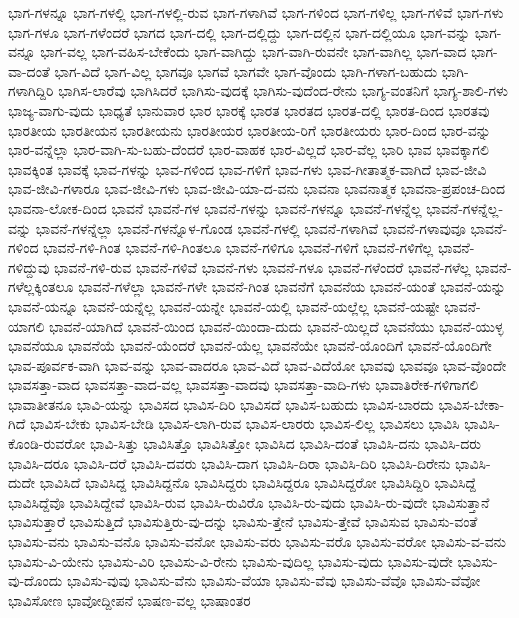 {ಭಾಗ-ಗಳನ್ನೂ
ಭಾಗ-ಗಳಲ್ಲಿ
ಭಾಗ-ಗಳಲ್ಲಿ-ರುವ
ಭಾಗ-ಗಳಾಗಿವೆ
ಭಾಗ-ಗಳಿಂದ
ಭಾಗ-ಗಳಿಲ್ಲ
ಭಾಗ-ಗಳಿವೆ
ಭಾಗ-ಗಳು
ಭಾಗ-ಗಳೂ
ಭಾಗ-ಗಳೆಂದರೆ
ಭಾಗದ
ಭಾಗ-ದಲ್ಲಿ
ಭಾಗ-ದಲ್ಲಿದ್ದು
ಭಾಗ-ದಲ್ಲಿನ
ಭಾಗ-ದಲ್ಲಿಯೂ
ಭಾಗ-ವನ್ನು
ಭಾಗ-ವನ್ನೂ
ಭಾಗ-ವಲ್ಲ
ಭಾಗ-ವಹಿಸ-ಬೇಕೆಂದು
ಭಾಗ-ವಾಗಿದ್ದು
ಭಾಗ-ವಾಗಿ-ರುವನೇ
ಭಾಗ-ವಾಗಿಲ್ಲ
ಭಾಗ-ವಾದ
ಭಾಗ-ವಾ-ದಂತೆ
ಭಾಗ-ವಿದೆ
ಭಾಗ-ವಿಲ್ಲ
ಭಾಗವೂ
ಭಾಗವೆ
ಭಾಗವೇ
ಭಾಗ-ವೊಂದು
ಭಾಗಿ-ಗಳಾಗ-ಬಹುದು
ಭಾಗಿ-ಗಳಾಗಿದ್ದಿರಿ
ಭಾಗಿಸ-ಲಾರೆವು
ಭಾಗಿಸಿದರೆ
ಭಾಗಿಸು-ವುದಕ್ಕೆ
ಭಾಗಿಸು-ವುದೆಂದ-ರೇನು
ಭಾಗ್ಯ-ವಂತನಿಗೆ
ಭಾಗ್ಯ-ಶಾಲಿ-ಗಳು
ಭಾಜ್ಯ-ವಾಗು-ವುದು
ಭಾಧ್ಯತೆ
ಭಾನುವಾರ
ಭಾರ
ಭಾರಕ್ಕೆ
ಭಾರತ
ಭಾರತದ
ಭಾರತ-ದಲ್ಲಿ
ಭಾರತ-ದಿಂದ
ಭಾರತವು
ಭಾರತೀಯ
ಭಾರತೀಯನ
ಭಾರತೀಯನು
ಭಾರತೀಯರ
ಭಾರತೀಯ-ರಿಗೆ
ಭಾರತೀಯರು
ಭಾರ-ದಿಂದ
ಭಾರ-ವನ್ನು
ಭಾರ-ವನ್ನೆಲ್ಲಾ
ಭಾರ-ವಾಗಿ-ಸು-ಬಹು-ದೆಂದರೆ
ಭಾರ-ವಾಹಕ
ಭಾರ-ವಿಲ್ಲದೆ
ಭಾರ-ವೆಲ್ಲ
ಭಾರಿ
ಭಾವ
ಭಾವಕ್ಕಾಗಲಿ
ಭಾವಕ್ಕಿಂತ
ಭಾವಕ್ಕೆ
ಭಾವ-ಗಳನ್ನು
ಭಾವ-ಗಳಿಂದ
ಭಾವ-ಗಳಿಗೆ
ಭಾವ-ಗಳು
ಭಾವ-ಗೀತಾತ್ಮಕ-ವಾಗಿದೆ
ಭಾವ-ಜೀವಿ
ಭಾವ-ಜೀವಿ-ಗಳಾರೂ
ಭಾವ-ಜೀವಿ-ಗಳು
ಭಾವ-ಜೀವಿ-ಯಾ-ದ-ವನು
ಭಾವನಾ
ಭಾವನಾತ್ಮಕ
ಭಾವನಾ-ಪ್ರಪಂಚ-ದಿಂದ
ಭಾವನಾ-ಲೋಕ-ದಿಂದ
ಭಾವನೆ
ಭಾವನೆ-ಗಳ
ಭಾವನೆ-ಗಳನ್ನು
ಭಾವನೆ-ಗಳನ್ನೂ
ಭಾವನೆ-ಗಳನ್ನೆಲ್ಲ
ಭಾವನೆ-ಗಳನ್ನೆಲ್ಲ-ವನ್ನು
ಭಾವನೆ-ಗಳನ್ನೆಲ್ಲಾ
ಭಾವನೆ-ಗಳನ್ನೊಳ-ಗೊಂಡ
ಭಾವನೆ-ಗಳಲ್ಲಿ
ಭಾವನೆ-ಗಳಾಗಿವೆ
ಭಾವನೆ-ಗಳಾವುವೂ
ಭಾವನೆ-ಗಳಿಂದ
ಭಾವನೆ-ಗಳಿ-ಗಿಂತ
ಭಾವನೆ-ಗಳಿ-ಗಿಂತಲೂ
ಭಾವನೆ-ಗಳಿಗೂ
ಭಾವನೆ-ಗಳಿಗೆ
ಭಾವನೆ-ಗಳಿಗೆಲ್ಲ
ಭಾವನೆ-ಗಳಿದ್ದುವು
ಭಾವನೆ-ಗಳಿ-ರುವ
ಭಾವನೆ-ಗಳಿವೆ
ಭಾವನೆ-ಗಳು
ಭಾವನೆ-ಗಳೂ
ಭಾವನೆ-ಗಳೆಂದರೆ
ಭಾವನೆ-ಗಳೆಲ್ಲ
ಭಾವನೆ-ಗಳೆಲ್ಲಕ್ಕಿಂತಲೂ
ಭಾವನೆ-ಗಳೆಲ್ಲಾ
ಭಾವನೆ-ಗಳೇ
ಭಾವನೆ-ಗಿಂತ
ಭಾವನೆಗೆ
ಭಾವನೆಯ
ಭಾವನೆ-ಯಂತೆ
ಭಾವನೆ-ಯನ್ನು
ಭಾವನೆ-ಯನ್ನೂ
ಭಾವನೆ-ಯನ್ನೆಲ್ಲ
ಭಾವನೆ-ಯನ್ನೇ
ಭಾವನೆ-ಯಲ್ಲಿ
ಭಾವನೆ-ಯಲ್ಲೆಲ್ಲ
ಭಾವನೆ-ಯಷ್ಟೇ
ಭಾವನೆ-ಯಾಗಲಿ
ಭಾವನೆ-ಯಾಗಿದೆ
ಭಾವನೆ-ಯಿಂದ
ಭಾವನೆ-ಯಿಂದಾ-ದುದು
ಭಾವನೆ-ಯಿಲ್ಲದೆ
ಭಾವನೆಯು
ಭಾವನೆ-ಯುಳ್ಳ
ಭಾವನೆಯೂ
ಭಾವನೆಯೆ
ಭಾವನೆ-ಯೆಂದರೆ
ಭಾವನೆ-ಯೆಲ್ಲ
ಭಾವನೆಯೇ
ಭಾವನೆ-ಯೊಂದಿಗೆ
ಭಾವನೆ-ಯೊಂದಿಗೇ
ಭಾವ-ಪೂರ್ವಕ-ವಾಗಿ
ಭಾವ-ವನ್ನು
ಭಾವ-ವಾದರೂ
ಭಾವ-ವಿದೆ
ಭಾವ-ವಿದೆಯೋ
ಭಾವವು
ಭಾವವೂ
ಭಾವ-ವೊಂದೇ
ಭಾವಸತ್ತಾ-ವಾದ
ಭಾವಸತ್ತಾ-ವಾದ-ವಲ್ಲ
ಭಾವಸತ್ತಾ-ವಾದವು
ಭಾವಸತ್ತಾ-ವಾದಿ-ಗಳು
ಭಾವಾತಿರೇಕ-ಗಳಿಗಾಗಲಿ
ಭಾವಾತೀತನೂ
ಭಾವಿ-ಯನ್ನು
ಭಾವಿಸದ
ಭಾವಿಸ-ದಿರಿ
ಭಾವಿಸದೆ
ಭಾವಿಸ-ಬಹುದು
ಭಾವಿಸ-ಬಾರದು
ಭಾವಿಸ-ಬೇಕಾ-ಗಿದೆ
ಭಾವಿಸ-ಬೇಕು
ಭಾವಿಸ-ಬೇಡಿ
ಭಾವಿಸ-ಲಾಗಿ-ರುವ
ಭಾವಿಸ-ಲಾರರು
ಭಾವಿಸ-ಲಿಲ್ಲ
ಭಾವಿಸಲು
ಭಾವಿಸಿ
ಭಾವಿಸಿ-ಕೊಂಡಿ-ರುವರೋ
ಭಾವಿ-ಸಿತ್ತು
ಭಾವಿಸಿತ್ತೊ
ಭಾವಿಸಿತ್ತೋ
ಭಾವಿಸಿದ
ಭಾವಿಸಿ-ದಂತೆ
ಭಾವಿಸಿ-ದನು
ಭಾವಿಸಿ-ದರು
ಭಾವಿಸಿ-ದರೂ
ಭಾವಿಸಿ-ದರೆ
ಭಾವಿಸಿ-ದವರು
ಭಾವಿಸಿ-ದಾಗ
ಭಾವಿಸಿ-ದಿರಾ
ಭಾವಿಸಿ-ದಿರಿ
ಭಾವಿಸಿ-ದಿರೇನು
ಭಾವಿಸಿ-ದುದೇ
ಭಾವಿಸಿದೆ
ಭಾವಿಸಿದ್ದ
ಭಾವಿಸಿದ್ದನೊ
ಭಾವಿಸಿದ್ದರು
ಭಾವಿಸಿದ್ದರೂ
ಭಾವಿಸಿದ್ದರೋ
ಭಾವಿಸಿದ್ದಿರಿ
ಭಾವಿಸಿದ್ದೆ
ಭಾವಿಸಿದ್ದೆವೊ
ಭಾವಿಸಿದ್ದೇವೆ
ಭಾವಿಸಿ-ರುವ
ಭಾವಿಸಿ-ರುವಿರೊ
ಭಾವಿಸಿ-ರು-ವುದು
ಭಾವಿಸಿ-ರು-ವುದೇ
ಭಾವಿಸುತ್ತಾನೆ
ಭಾವಿಸುತ್ತಾರೆ
ಭಾವಿಸುತ್ತಿದೆ
ಭಾವಿಸುತ್ತಿರು-ವು-ದನ್ನು
ಭಾವಿಸು-ತ್ತೇನೆ
ಭಾವಿಸು-ತ್ತೇವೆ
ಭಾವಿಸುವ
ಭಾವಿಸು-ವಂತೆ
ಭಾವಿಸು-ವನು
ಭಾವಿಸು-ವನೊ
ಭಾವಿಸು-ವನೋ
ಭಾವಿಸು-ವರು
ಭಾವಿಸು-ವರೊ
ಭಾವಿಸು-ವರೋ
ಭಾವಿಸು-ವ-ವನು
ಭಾವಿಸು-ವಿ-ಯೇನು
ಭಾವಿಸು-ವಿರಿ
ಭಾವಿಸು-ವಿ-ರೇನು
ಭಾವಿಸು-ವುದಿಲ್ಲ
ಭಾವಿಸು-ವುದು
ಭಾವಿಸು-ವುದೇ
ಭಾವಿಸು-ವು-ದೊಂದು
ಭಾವಿಸು-ವುವು
ಭಾವಿಸು-ವೆನು
ಭಾವಿಸು-ವೆಯಾ
ಭಾವಿಸು-ವೆವು
ಭಾವಿಸು-ವೆವೊ
ಭಾವಿಸು-ವೆವೋ
ಭಾವಿಸೋಣ
ಭಾವೋದ್ದೀಪನೆ
ಭಾಷಣ-ವಲ್ಲ
ಭಾಷಾಂತರ
}
